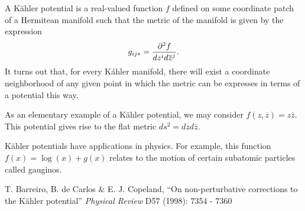\documentclass[12pt]{article}
\begin{document}
A {K\"ahler potential} is a real-valued function $f$ defined on some coordinate patch of a  
Hermitean manifold such that the metric of the manifold is given by the expression
\[
 g_{ij*} = {\partial^2 f \over dz^i d{\overline z}^j} .
\]
It turns out that, for every K\'ahler manifold, there will exist a coordinate neighborhood of any 
given point in which the metric can be expresses in terms of a potential this way.

As an elementary example of a K\"ahler potential, we may consider $f(z,{\overline z}) = z
{\overline z}$.  This potential gives rise to the flat metric $ds^2 = dz d{\overline z}$.

K\"ahler potentials have applications in physics. For example, this function $f(x) = \log(x) + g(x)$ relates to the motion of certain subatomic particles called gauginos.

\begin{thebibliography}{1}
 T. Barreiro, B. de Carlos \& E. J. Copeland, ``On non-perturbative corrections to the K\"ahler potential'' {\it Physical Review} D57 (1998): 7354 - 7360
\end{thebibliography}
\end{document}
